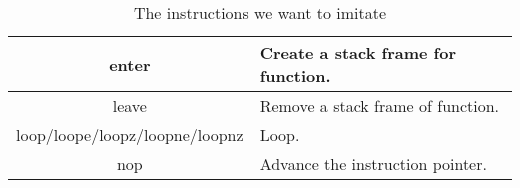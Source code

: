 \documentclass[12pt]{extarticle}
\begin{document}
\begin{table}[h!]
\begin{tabular}{||c | p{9cm}||}
             \hline
             enter & Create a stack frame for function.\\
             \hline
             leave & Remove a stack frame of function.\\
             \hline
             loop/loope/loopz/loopne/loopnz & Loop.\\
             \hline
             nop & Advance the instruction pointer.\\
             \hline
            \end{tabular}
            \caption{The instructions we want to imitate}
            \label{table:2}
        \end{table}

{}

\end{document}
